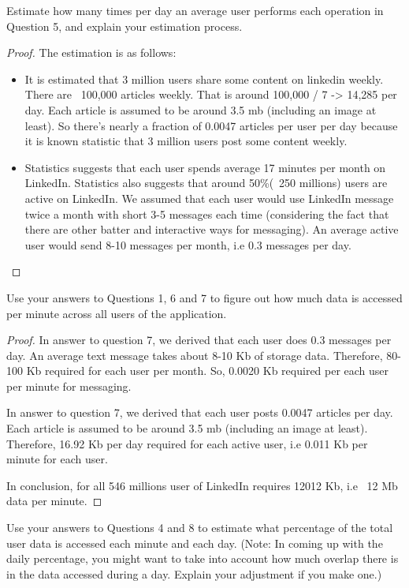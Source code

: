 \documentclass[12pt]{article}
\newenvironment{problem}[2][Problem]{\begin{trivlist}
\item[\hskip \labelsep {\bfseries #1}\hskip \labelsep {\bfseries #2.}]}{\end{trivlist}}
\begin{document}
\begin{problem}{7}
Estimate how many times per day an average user performs each operation in Question 5, and explain your estimation process.
\end{problem}
 
\begin{proof}
The estimation is as follows:
\begin{itemize}
\item It is estimated that 3 million users share some content on linkedin weekly. There are ~100,000 articles weekly. That is around 100,000 / 7 -> 14,285 per day. Each article is assumed to be around 3.5 mb (including an image at least). So there’s nearly a fraction of 0.0047 articles per user per day because it is known statistic that 3 million users post some content weekly.
\item Statistics suggests that each user spends average 17 minutes per month on LinkedIn. Statistics also suggests that around 50\%(~250 millions)  users are active on LinkedIn. We assumed that each user would use LinkedIn message twice a month with short 3-5 messages each time (considering the fact that there are other batter and interactive ways for messaging). An average active user would send 8-10 messages per month, i.e 0.3 messages per day.
\end{itemize}
\end{proof}
\begin{problem}{8}
Use your answers to Questions 1, 6 and 7 to figure out how much data is accessed per minute across all users of the application.
\end{problem}
 
\begin{proof}
In answer to question 7, we derived that each user does 0.3 messages per day. An average text message takes about 8-10 Kb of storage data. Therefore, 80-100 Kb required for each user per month. So, 0.0020 Kb required per each user per minute for messaging. 

In answer to question 7, we derived that each user posts  0.0047 articles per day. Each article is assumed to be around 3.5 mb (including an image at least). Therefore, 16.92 Kb per day required for each active user, i.e 0.011 Kb per minute for each user.

In conclusion, for all 546 millions user of LinkedIn requires 12012 Kb, i.e ~12 Mb data per minute.

\end{proof}
\begin{problem}{9}
Use your answers to Questions 4 and 8 to estimate what percentage of the total user data is accessed each minute and each day. (Note: In coming up with the daily percentage, you might want to take into account how much overlap there is in the data accessed during a day. Explain your adjustment if you make one.)
\end{problem}
 
\end{document}
